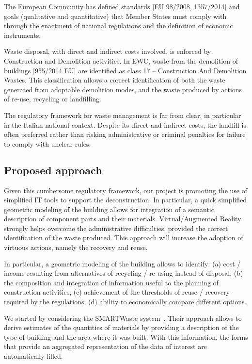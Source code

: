 \documentclass[a4paper,twoside]{article}
\begin{document}
\noindent
The European Community has defined standards [EU 98/2008, 1357/2014] and goals (qualitative and quantitative) that Member States must comply with through the enactment of national regulations and the definition of economic instruments.

Waste disposal, with direct and indirect costs involved, is enforced by Construction and Demolition activities. In EWC, waste from the demolition of buildings [955/2014 EU] are identified as class 17 -- Construction And Demolition Wastes.
This classification allows a correct identification of both the waste generated from adoptable demolition modes, and the waste produced by actions of re-use, recycling or landfilling.
 
The regulatory framework for waste management is far from clear, in particular in the Italian national context. Despite its direct and indirect costs, the landfill is often preferred rather than risking administrative or criminal penalties for failure to comply with unclear rules.

\subsection{Proposed approach}

\noindent
Given this cumbersome regulatory framework, our project is promoting the use of simplified IT tools to support the deconstruction. In particular, a quick simplified geometric modeling of the building allows for integration of a semantic description of component parts and their materials. Virtual/Augmented Reality  strongly helps overcome the administrative difficulties, provided the correct identification of the waste produced.
This approach will increase the adoption of virtuous actions, namely the recovery and reuse.

In particular, a  geometric modeling of the building allows to identify:
(a) cost / income resulting from alternatives of recycling / re-using instead of disposal;
(b) the composition and integration of information useful to the planning of construction activities;
(c) achievement of the thresholds of reuse / recovery required by the regulations;
(d) ability to economically compare different options.

We started by considering the SMARTWaste system~\cite{smartWaste}. Their approach allows to derive estimates of the quantities of materials by providing a description of the type of building and the area where it was built. With this information, the forms that provide an aggregated representation of the data of interest are automatically filled.
\end{document}
